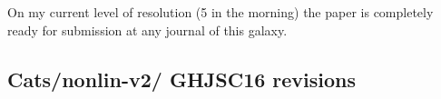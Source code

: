 \begin{description}

      {
 On my current level of resolution (5 in the morning)
the paper is completely ready for submission  at any journal of this
galaxy.
    }
\end{description}

\subsection{Cats/nonlin-v2/  GHJSC16 revisions}
\label{sect:GHJSC16blogV2}
